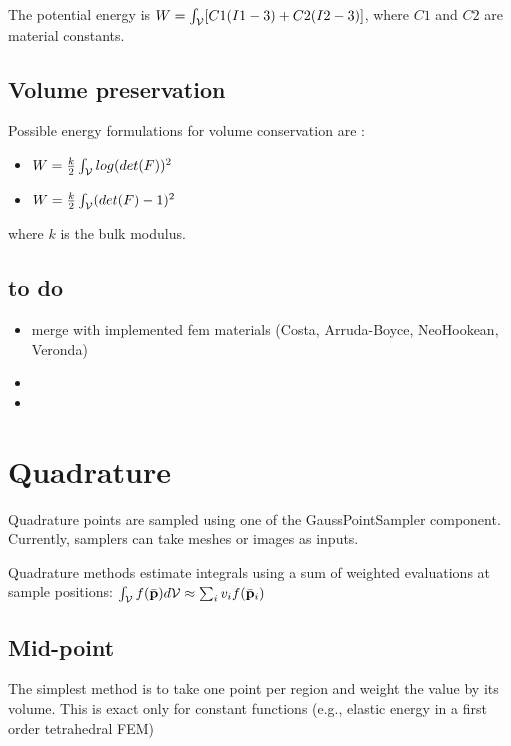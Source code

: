 The potential energy is $W= \int_{\mathcal{V}} [ C1 ( I1 - 3)  + C2 ( I2 - 3) ]$, where $C1$ and $C2$ are material constants.

\subsection{Volume preservation}

Possible energy formulations for volume conservation are :
\begin{itemize}
 \item $W= \frac{k}{2} \int_{\mathcal{V}} log( det(F) )^2$
 \item $W= \frac{k}{2} \int_{\mathcal{V}} (det(F)-1)^2$
\end{itemize}
where $k$ is the bulk modulus.

\subsection{to do}

\begin{itemize}
 \item merge with implemented fem materials (Costa, Arruda-Boyce, NeoHookean, Veronda)
 \item 
 \item 
\end{itemize}

\newpage
\section{Quadrature} \label{sec quadrature}

Quadrature points are sampled using one of the GaussPointSampler component.
Currently, samplers can take meshes or images as inputs.

Quadrature methods estimate integrals using a sum of weighted evaluations at sample positions: $\int_{\mathcal{V}} f(\bar{\mathbf{{p}}}) d\mathcal{V} \approx \sum_i v_i f(\bar{\mathbf{{p}}}_i) $

\subsection{Mid-point}

The simplest method is to take one point per region and weight the value by its volume.
This is exact only for constant functions (e.g., elastic energy in a first order tetrahedral FEM)

